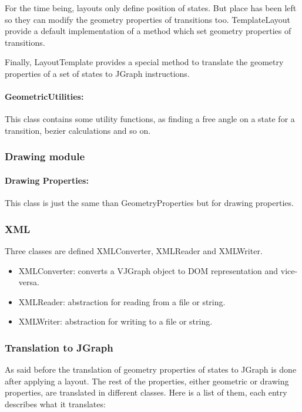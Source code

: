For the time being, layouts only define position of states. But place
has been left so they can modify the geometry properties of
transitions too. TemplateLayout provide a default implementation of a
method which set geometry properties of transitions.

Finally, LayoutTemplate provides a special method to translate the
geometry properties of a set of states to JGraph instructions.

\paragraph{GeometricUtilities:}

This class contains some utility functions, as finding a free angle on
a state for a transition, bezier calculations and so on.


\subsubsection{Drawing module}

\paragraph{Drawing Properties:}

This class is just the same than GeometryProperties but for drawing
properties.

\subsubsection{XML}

Three classes are defined XMLConverter, XMLReader and XMLWriter.

\begin{itemize}
\item XMLConverter: converts a VJGraph object to DOM representation
  and vice-versa.
\item XMLReader: abstraction for reading from a file or string.
\item XMLWriter: abstraction for writing to a file or string.
\end{itemize}


\subsubsection{Translation to JGraph}

As said before the translation of geometry properties of states to
JGraph is done after applying a layout.
The rest of the properties, either geometric or drawing properties,
are translated in different classes. Here is a list of them, each
entry describes what it translates:

